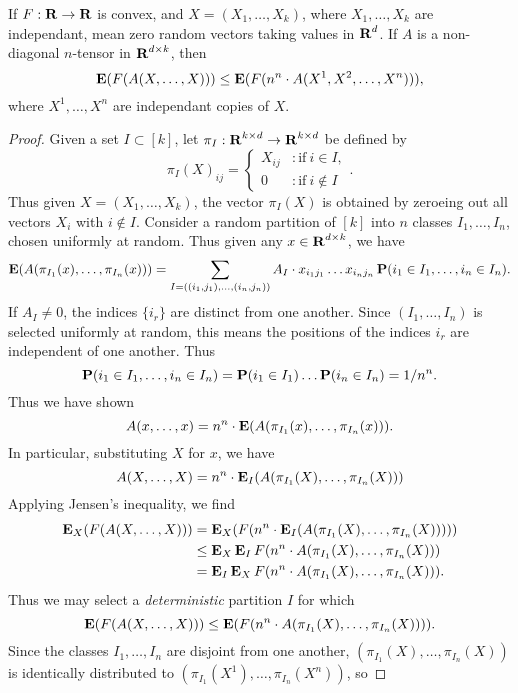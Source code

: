 \begin{lemma}[Decoupling]
	If $F: \operatorname{\mathbf{R}} \to \operatorname{\mathbf{R}}$ is convex, and $X = (X_1, \dots, X_k)$, where $X_1, \dots, X_k$ are independant, mean zero random vectors taking values in $\operatorname{\mathbf{R}}^d$. If $A$ is a non-diagonal $n$-tensor in $\operatorname{\mathbf{R}}^{d \times k}$, then
	\[ \operatorname{\mathbf{E}}(F(A(X,\dots,X))) \leq \operatorname{\mathbf{E}}(F(n^n \cdot A(X^1,X^2,\dots,X^n))), \]
	where $X^1, \dots, X^n$ are independant copies of $X$.
\end{lemma}
\begin{proof}
	Given a set $I \subset [k]$, let $\pi_I: \operatorname{\mathbf{R}}^{k \times d} \to \operatorname{\mathbf{R}}^{k \times d}$ be defined by
	\[ \pi_{I}(X)_{ij} = \begin{cases} X_{ij} &: \text{if}\ i \in I, \\ 0 &: \text{if}\ i \not \in I \end{cases}. \]
	Thus given $X = (X_1, \dots, X_k)$, the vector $\pi_I(X)$ is obtained by zeroeing out all vectors $X_i$ with $i \not \in I$. Consider a random partition of $[k]$ into $n$ classes $I_1, \dots, I_n$, chosen uniformly at random. Thus given any $x \in \operatorname{\mathbf{R}}^{d \times k}$, we have
	\[ \operatorname{\mathbf{E}}(A(\pi_{I_1}(x),\dots,\pi_{I_n}(x))) = \sum_{I=((i_1,j_1),\dots,(i_n,j_n))} A_I \cdot x_{i_1 j_1} \dots x_{i_n j_n} \operatorname{\mathbf{P}}(i_1 \in I_1, \dots, i_n \in I_n). \]
	If $A_I \neq 0$, the indices $\{ i_r \}$ are distinct from one another. Since $(I_1,\dots,I_n)$ is selected uniformly at random, this means the positions of the indices $i_r$ are independent of one another. Thus
	\[ \operatorname{\mathbf{P}}(i_1 \in I_1, \dots, i_n \in I_n) = \operatorname{\mathbf{P}}(i_1 \in I_1) \dots \operatorname{\mathbf{P}}(i_n \in I_n) = 1/n^n. \]
	Thus we have shown
	\[ A(x,\dots,x) = n^n \cdot \operatorname{\mathbf{E}}(A(\pi_{I_1}(x), \dots, \pi_{I_n}(x))). \]
	In particular, substituting $X$ for $x$, we have
	\[ A(X,\dots,X) = n^n \cdot \operatorname{\mathbf{E}}_I(A(\pi_{I_1}(X), \dots, \pi_{I_n}(X))) \]
	Applying Jensen's inequality, we find
	\begin{align*}
		\operatorname{\mathbf{E}}_X(F(A(X,\dots,X))) &= \operatorname{\mathbf{E}}_X(F(n^n \cdot \operatorname{\mathbf{E}}_I(A(\pi_{I_1}(X), \dots, \pi_{I_n}(X)))))\\
		&\leq \operatorname{\mathbf{E}}_X \operatorname{\mathbf{E}}_I F(n^n \cdot A(\pi_{I_1}(X), \dots, \pi_{I_n}(X)))\\
		&= \operatorname{\mathbf{E}}_I \operatorname{\mathbf{E}}_X F(n^n \cdot A(\pi_{I_1}(X), \dots, \pi_{I_n}(X))).
	\end{align*}
	Thus we may select a \emph{deterministic} partition $I$ for which
	\[ \operatorname{\mathbf{E}}(F(A(X,\dots,X))) \leq \operatorname{\mathbf{E}}(F(n^n \cdot A(\pi_{I_1}(X),\dots,\pi_{I_n}(X)))). \]
	Since the classes $I_1, \dots, I_n$ are disjoint from one another, $(\pi_{I_1}(X), \dots, \pi_{I_n}(X))$ is identically distributed to $(\pi_{I_1}(X^1), \dots, \pi_{I_n}(X^n))$, so

\end{proof}
